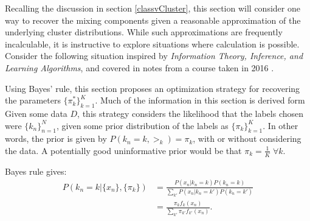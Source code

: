 Recalling the discussion in section \ref{classvCluster}, this section will consider one way to recover the mixing components given a reasonable approximation of the underlying cluster distributions. While such approximations are frequently incalculable, it is instructive to explore situations where calculation is possible. Consider the following situation inspired by \textit{Information Theory, Inference, and Learning Algorithms}\citep{MacKay2002}, and covered in notes from a course taken in 2016 \cite{rychlikCourse}.

Using Bayes' rule, this section proposes an optimization strategy for recovering the parameters $\{\pi_k^{\ast}\}_{k=1}^{K}$. Much of the information in this section is derived form Given some data $D$, this strategy considers the likelihood that the labels chosen were $\{k_n\}_{n=1}^{N}$, given some prior distribution of the labels as $\{\pi_k\}_{k=1}^{K}$. In other words, the prior is given by $P(k_n=k, \bm \gt_k) = \pi_k$, with or without considering the data. A potentially good uninformative prior would be that $\pi_k=\frac 1K\;\forall k$.

Bayes rule gives:
\begin{align}\label{Bayes1}
P(k_n=k|\{x_n\},\{\pi_k\})&=\frac{P(x_n|k_n=k)P(k_n=k)}{\sum_{k'}P(x_n|k_n=k')P(k_n=k')} \nonumber \\
						  &=\frac{\pi_k f_k(x_n)}{\sum_{k'}\pi_{k'} f_{k'}(x_n)}.
\end{align}

